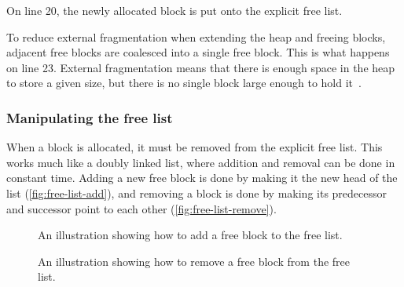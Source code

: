 On line 20, the newly allocated block is put onto the explicit free list.

To reduce external fragmentation when extending the heap and freeing blocks, adjacent free blocks are coalesced into a single free block. This is what happens on line 23. External fragmentation means that there is enough space in the heap to store a given size, but there is no single block large enough to hold it~\cite[p. 883]{computersystems}.

\subsubsection{Manipulating the free list}
\label{sec:manipulate-free-list}

When a block is allocated, it must be removed from the explicit free list. This works much like a doubly linked list, where addition and removal can be done in constant time. Adding a new free block is done by making it the new head of the list (\autoref{fig:free-list-add}), and removing a block is done by making its predecessor and successor point to each other (\autoref{fig:free-list-remove}).

\begin{figure}[H]
  \centering
  \hbox{}
  \caption{An illustration showing how to add a free block to the free list.}
  \label{fig:free-list-add}
\end{figure}

\begin{figure}[H]
  \centering
  \hbox{}
  \caption{An illustration showing how to remove a free block from the free list.}
  \label{fig:free-list-remove}
\end{figure}

